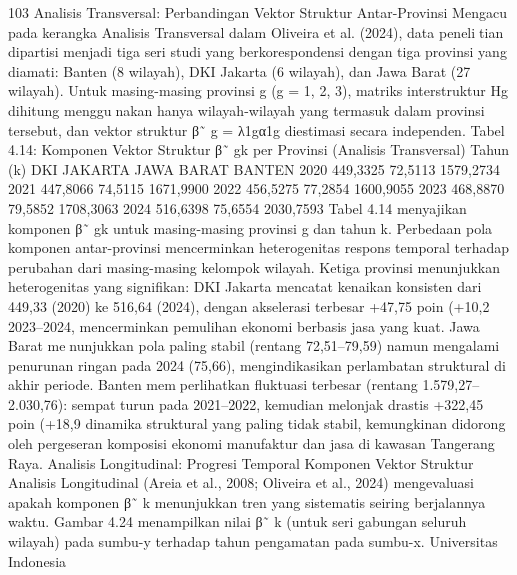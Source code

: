 103
Analisis Transversal: Perbandingan Vektor Struktur Antar-Provinsi
Mengacu pada kerangka Analisis Transversal dalam Oliveira et al. (2024), data penelitian dipartisi menjadi tiga seri studi yang berkorespondensi dengan tiga provinsi yang
diamati: Banten (8 wilayah), DKI Jakarta (6 wilayah), dan Jawa Barat (27 wilayah).
Untuk masing-masing provinsi g (g = 1, 2, 3), matriks interstruktur Hg dihitung menggunakan hanya wilayah-wilayah yang termasuk dalam provinsi tersebut, dan vektor struktur
β˜
g = λ1gα1g diestimasi secara independen.
Tabel 4.14: Komponen Vektor Struktur β˜
gk per Provinsi (Analisis Transversal)
Tahun (k) DKI JAKARTA JAWA BARAT BANTEN
2020 449,3325 72,5113 1579,2734
2021 447,8066 74,5115 1671,9900
2022 456,5275 77,2854 1600,9055
2023 468,8870 79,5852 1708,3063
2024 516,6398 75,6554 2030,7593
Tabel 4.14 menyajikan komponen β˜
gk untuk masing-masing provinsi g dan tahun k.
Perbedaan pola komponen antar-provinsi mencerminkan heterogenitas respons temporal
terhadap perubahan dari masing-masing kelompok wilayah. Ketiga provinsi menunjukkan
heterogenitas yang signifikan: DKI Jakarta mencatat kenaikan konsisten dari 449,33
(2020) ke 516,64 (2024), dengan akselerasi terbesar +47,75 poin (+10,2%
2023–2024, mencerminkan pemulihan ekonomi berbasis jasa yang kuat. Jawa Barat menunjukkan pola paling stabil (rentang 72,51–79,59) namun mengalami penurunan ringan
pada 2024 (75,66), mengindikasikan perlambatan struktural di akhir periode. Banten memperlihatkan fluktuasi terbesar (rentang 1.579,27–2.030,76): sempat turun pada 2021–2022,
kemudian melonjak drastis +322,45 poin (+18,9%
dinamika struktural yang paling tidak stabil, kemungkinan didorong oleh pergeseran
komposisi ekonomi manufaktur dan jasa di kawasan Tangerang Raya.
Analisis Longitudinal: Progresi Temporal Komponen Vektor Struktur
Analisis Longitudinal (Areia et al., 2008; Oliveira et al., 2024) mengevaluasi apakah
komponen β˜
k menunjukkan tren yang sistematis seiring berjalannya waktu. Gambar 4.24
menampilkan nilai β˜
k (untuk seri gabungan seluruh wilayah) pada sumbu-y terhadap tahun
pengamatan pada sumbu-x.
Universitas Indonesia

